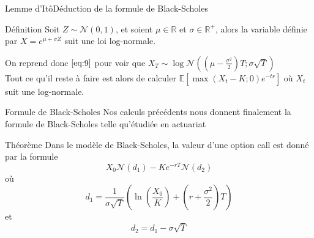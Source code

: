 \documentclass{beamer}
\newcommand{\1}{\mathmybb{1}}
\begin{document}
   \begin{frame}{Lemme d'Itô}{Déduction de la formule de Black-Scholes}
     \begin{block}{Définition}
       Soit $Z \sim \mathcal{N}\left(0, 1 \right)$, et soient $\mu \in \mathbb{R}$ et $\sigma \in \mathbb{R}^{+}$, alors la variable définie par $ X = e^{\mu + \sigma Z}$ suit une loi log-normale.
     \end{block}
     On reprend donc $ \ref{eq:9} $ pour voir que $X_{T} \sim \log \mathcal{N} \left( \left( \mu - \frac{\sigma^{2}}{2} \right) T; \sigma \sqrt{T}  \right)$ \\
     \pause
     Tout ce qu'il reste à faire est alors de calculer $\mathbb{E}\left[\max(X_{t} - K; 0)e^{-tr}\right]$ où $ X_{t}$ suit une log-normale.

   \end{frame}
   \begin{frame}{Formule de Black-Scholes}
     Nos calculs précédents nous donnent finalement la formule de Black-Scholes telle qu'étudiée en actuariat
     \begin{block}{Théorème}
       Dans le modèle de Black-Scholes, la valeur d'une option call est donné par la formule
       \begin{equation}
         X_{0}\mathcal{N}(d_{1}) - Ke^{-rT}\mathcal{N}(d_{2})
       \end{equation}
       où
       \[
         d_{1} = \frac{1}{\sigma \sqrt{T}} \left( \ln \left(\frac{X_{0}}{K} \right) + \left( r + \frac{\sigma^{2}}{2} \right)T \right)
       \]
       et
       \[
         d_{2} = d_{1} - \sigma \sqrt{T}
       \]
    \end{block}
   \end{frame}
\end{document}
